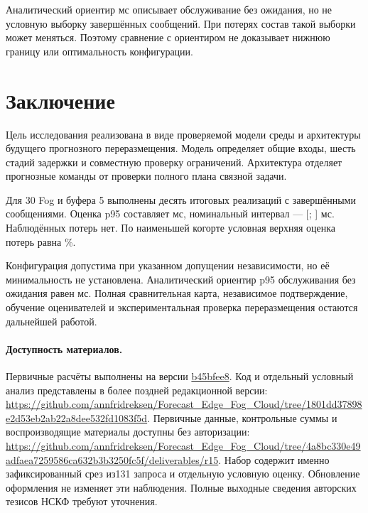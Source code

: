 \documentclass{psta}
\begin{document}
Аналитический ориентир \dServiceQ{} мс описывает обслуживание без ожидания, но не условную выборку завершённых сообщений. При потерях состав такой выборки может меняться. Поэтому сравнение с ориентиром не доказывает нижнюю границу или оптимальность конфигурации.

\section{Заключение}\label{sec:conclusion}
Цель исследования реализована в виде проверяемой модели среды и архитектуры будущего прогнозного переразмещения. Модель определяет общие входы, шесть стадий задержки и совместную проверку ограничений. Архитектура отделяет прогнозные команды от проверки полного плана связной задачи.

Для 30 Fog и буфера 5 выполнены десять итоговых реализаций с \dArrivals{} завершёнными сообщениями. Оценка p95 составляет \dQ{} мс, номинальный интервал --- [\dQlo{}; \dQhi{}] мс. Наблюдённых потерь нет. По наименьшей когорте \cNmin{} условная верхняя оценка потерь равна \cLossPercent{}\%.

Конфигурация допустима при указанном допущении независимости, но её минимальность не установлена. Аналитический ориентир p95 обслуживания без ожидания равен \dServiceQ{} мс. Полная сравнительная карта, независимое подтверждение, обучение оценивателей и экспериментальная проверка переразмещения остаются дальнейшей работой.

\paragraph{Доступность материалов.}
Первичные расчёты выполнены на версии \href{https://github.com/annfridreksen/Forecast_Edge_Fog_Cloud/tree/b45bfee84d9b0727243faf6cd28eeda776813566}{b45bfee8}.
Код и отдельный условный анализ представлены в более поздней редакционной версии:
\url{https://github.com/annfridreksen/Forecast_Edge_Fog_Cloud/tree/1801dd37898e2d53eb2ab22a8dee532fd1083f5d}.
Первичные данные, контрольные суммы и воспроизводящие материалы доступны без авторизации:
\url{https://github.com/annfridreksen/Forecast_Edge_Fog_Cloud/tree/4a8bc330e49adfaea7259586ca632b3b3250fc5f/deliverables/r15}.
Набор содержит именно зафиксированный срез из131 запроса и отдельную условную оценку. Обновление оформления не изменяет эти наблюдения. Полные выходные сведения авторских тезисов НСКФ требуют уточнения.

\raggedbottom

\English\maketitle
\end{document}
